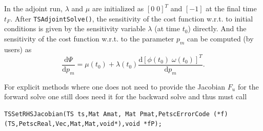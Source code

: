 In the adjoint run, $\lambda$ and $\mu$ are initialized as $[ 0 \;  0 ]^T$ and $[-1]$ at the final time $t_F$.
After \lstinline{TSAdjointSolve()}, the sensitivity of the cost function w.r.t. to initial conditions is given by the sensitivity variable $\lambda$ (at time $t_0$) directly.
And the sensitivity of the cost function w.r.t. to the parameter $p_m$ can be computed (by users) as
%
\[
\frac{\mathrm{d} \Psi}{\mathrm{d} p_m} = \mu(t_0) + \lambda(t_0)  \frac{\mathrm{d} \left[ \phi(t_0) \; \omega(t_0) \right]^T}{\mathrm{d} p_m}  .
\]

For explicit methods where one does not need to provide the
Jacobian $F_u$ for the forward solve one still does need it for the
backward solve and thus must call
\begin{lstlisting}
TSSetRHSJacobian(TS ts,Mat Amat, Mat Pmat,PetscErrorCode (*f)(TS,PetscReal,Vec,Mat,Mat,void*),void *fP);
\end{lstlisting}

